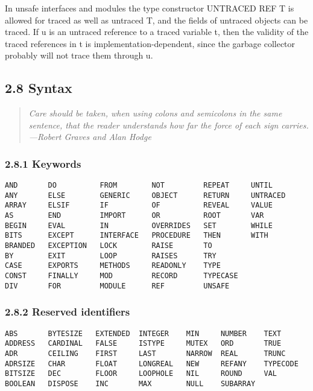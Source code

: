 \documentclass[10pt]{article}
\begin{document}
 In unsafe interfaces and modules the type constructor UNTRACED REF T is allowed for traced as well as untraced T, and the fields of untraced objects can be traced. If u is an untraced reference to a traced variable t, then the validity of the traced references in t is implementation-dependent, since the garbage collector probably will not trace them through u. 


 
\subsection*{2.8 Syntax}


 
\begin{quote}
\emph{ Care should be taken, when using colons and semicolons in the same sentence, that the reader understands how far the force of each sign carries. ---Robert Graves and Alan Hodge }
\end{quote}



 
\subsubsection*{2.8.1 Keywords}


 
\begin{verbatim}
AND       DO          FROM        NOT         REPEAT     UNTIL   
ANY       ELSE        GENERIC     OBJECT      RETURN     UNTRACED
ARRAY     ELSIF       IF          OF          REVEAL     VALUE   
AS        END         IMPORT      OR          ROOT       VAR     
BEGIN     EVAL        IN          OVERRIDES   SET        WHILE   
BITS      EXCEPT      INTERFACE   PROCEDURE   THEN       WITH    
BRANDED   EXCEPTION   LOCK        RAISE       TO                 
BY        EXIT        LOOP        RAISES      TRY                
CASE      EXPORTS     METHODS     READONLY    TYPE               
CONST     FINALLY     MOD         RECORD      TYPECASE           
DIV       FOR         MODULE      REF         UNSAFE             
\end{verbatim}



 
\subsubsection*{2.8.2 Reserved identifiers}


 
\begin{verbatim}
ABS       BYTESIZE   EXTENDED  INTEGER    MIN     NUMBER    TEXT    
ADDRESS   CARDINAL   FALSE     ISTYPE     MUTEX   ORD       TRUE    
ADR       CEILING    FIRST     LAST       NARROW  REAL      TRUNC   
ADRSIZE   CHAR       FLOAT     LONGREAL   NEW     REFANY    TYPECODE
BITSIZE   DEC        FLOOR     LOOPHOLE   NIL     ROUND     VAL     
BOOLEAN   DISPOSE    INC       MAX        NULL    SUBARRAY           
\end{verbatim}
\end{document}
